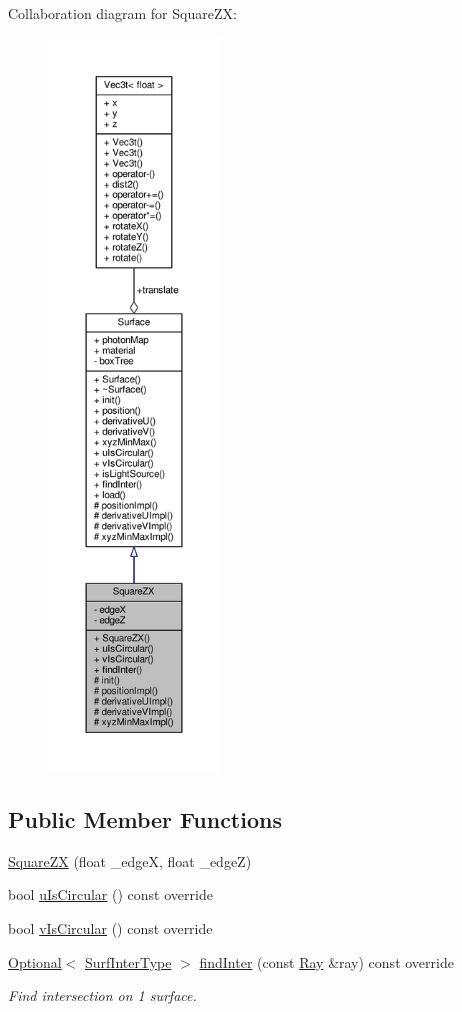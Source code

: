 Collaboration diagram for Square\+ZX\+:
\nopagebreak
\begin{figure}[H]
\begin{center}
\leavevmode
\includegraphics[height=550pt]{classSquareZX__coll__graph}
\end{center}
\end{figure}
\subsection*{Public Member Functions}
\begin{DoxyCompactItemize}
\item 
\hyperlink{classSquareZX_a18592605121c1b9f52aefd5895ee144c}{Square\+ZX} (float \+\_\+edgeX, float \+\_\+edgeZ)
\item 
bool \hyperlink{classSquareZX_a912de0928a8332afb6cb89179595668a}{u\+Is\+Circular} () const override
\item 
bool \hyperlink{classSquareZX_a5556f34a0c9e6c07f59c488857937b35}{v\+Is\+Circular} () const override
\item 
\hyperlink{classOptional}{Optional}$<$ \hyperlink{structSurfInterType}{Surf\+Inter\+Type} $>$ \hyperlink{classSquareZX_a2de50bbf52fc3243eaf1b68099224321}{find\+Inter} (const \hyperlink{structRay}{Ray} \&ray) const override
\begin{DoxyCompactList}\small\item\em Find intersection on 1 surface. \end{DoxyCompactList}\end{DoxyCompactItemize}
